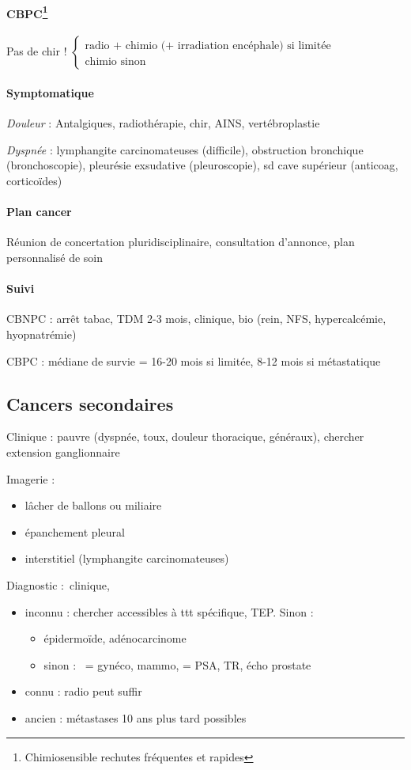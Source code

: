 \documentclass{article}
\begin{document}
\paragraph{CBPC\footnote{Chimiosensible rechutes fréquentes et rapides}}
Pas de chir !
$
\left \{
  \begin{array}{l}
    \text{radio + chimio (+ irradiation encéphale) si limitée}\\
    \text{chimio sinon}
  \end{array}
\right.
$

\paragraph{Symptomatique}
\textit{Douleur}  : Antalgiques, radiothérapie, chir, AINS, vertébroplastie

\textit{Dyspnée}  : lymphangite carcinomateuses (difficile), obstruction bronchique
(bronchoscopie), pleurésie exsudative (pleuroscopie), sd cave supérieur
(anticoag, corticoïdes)

\paragraph{Plan cancer}
Réunion de concertation pluridisciplinaire, consultation d'annonce, plan
personnalisé de soin
\paragraph{Suivi}
CBNPC : arrêt tabac, TDM 2-3 mois, clinique, bio (rein, NFS, hypercalcémie,
hyopnatrémie)

CBPC : médiane de survie = 16-20 mois si limitée, 8-12 mois si métastatique
\subsection{Cancers secondaires}
Clinique : pauvre (dyspnée, toux, douleur thoracique, généraux), chercher extension ganglionnaire

Imagerie : 
\begin{itemize}
\item lâcher de ballons ou miliaire
\item épanchement pleural
\item interstitiel (lymphangite carcinomateuses)
\end{itemize}

Diagnostic : clinique, 
\begin{itemize}
\item inconnu : chercher accessibles à ttt spécifique, TEP. Sinon :
  \begin{itemize}
  \item épidermoïde, adénocarcinome
  \item sinon : \female{} = {gynéco, mammo}, \male{} = {PSA, TR, écho prostate}
  \end{itemize}
\item connu : radio peut suffir
\item ancien : métastases 10 ans plus tard possibles
\end{itemize}
\end{document}
